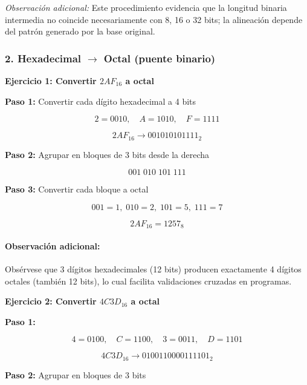 \documentclass[12pt,twoside]{book}
\begin{document}
						\noindent
						\emph{Observación adicional:} Este procedimiento evidencia que la longitud binaria intermedia no coincide necesariamente con 8, 16 o 32 bits; la alineación depende del patrón generado por la base original.
						
						\subsubsection*{2. Hexadecimal $\rightarrow$ Octal (puente binario)}
						
						\noindent
						\textbf{Ejercicio 1: Convertir $2AF_{16}$ a octal}
						
						\noindent
						\textbf{Paso 1:} Convertir cada dígito hexadecimal a 4 bits
						
						\[
						2=0010,\quad A=1010,\quad F=1111
						\]
						
						\[
						2AF_{16} \rightarrow 001010101111_2
						\]
						
						\noindent
						\textbf{Paso 2:} Agrupar en bloques de 3 bits desde la derecha
						
						\[
						001\;010\;101\;111
						\]
						
						\noindent
						\textbf{Paso 3:} Convertir cada bloque a octal
						
						\[
						001=1,\;010=2,\;101=5,\;111=7
						\]
						
						\[
						2AF_{16} = 1257_8
						\]
						
						\noindent
						\paragraph{Observación adicional:} Obsérvese que 3 dígitos hexadecimales (12 bits) producen exactamente 4 dígitos octales (también 12 bits), lo cual facilita validaciones cruzadas en programas.
						
						\bigskip
						
						\noindent
						\textbf{Ejercicio 2: Convertir $4C3D_{16}$ a octal}
						
						\noindent
						\textbf{Paso 1:}
						
						\[
						4=0100,\quad C=1100,\quad 3=0011,\quad D=1101
						\]
						
						\[
						4C3D_{16} \rightarrow 0100110000111101_2
						\]
						
						\noindent
						\textbf{Paso 2:} Agrupar en bloques de 3 bits
						
\end{document}
